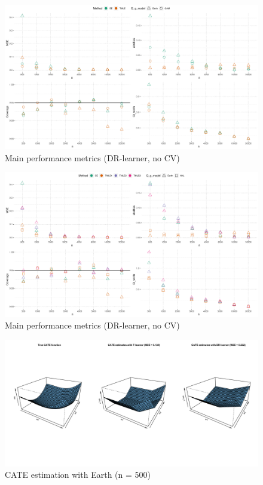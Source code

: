 \documentclass[
]{article}
\begin{document}
\begin{figure}[H]

{\centering \includegraphics[width=1\linewidth]{plot_dots_dr_nocv_v} 

}

\caption{Main performance metrics (DR-learner, no CV)}\label{fig:unnamed-chunk-19}
\end{figure}

\begin{figure}[H]

{\centering \includegraphics[width=1\linewidth]{plot_dots_dr_nocv_all} 

}

\caption{Main performance metrics (DR-learner, no CV)}\label{fig:unnamed-chunk-20}
\end{figure}

\begin{figure}[H]

{\centering \includegraphics[width=1\linewidth]{cate_500} 

}

\caption{CATE estimation with Earth (n = 500)}\label{fig:unnamed-chunk-21}
\end{figure}
\end{document}
